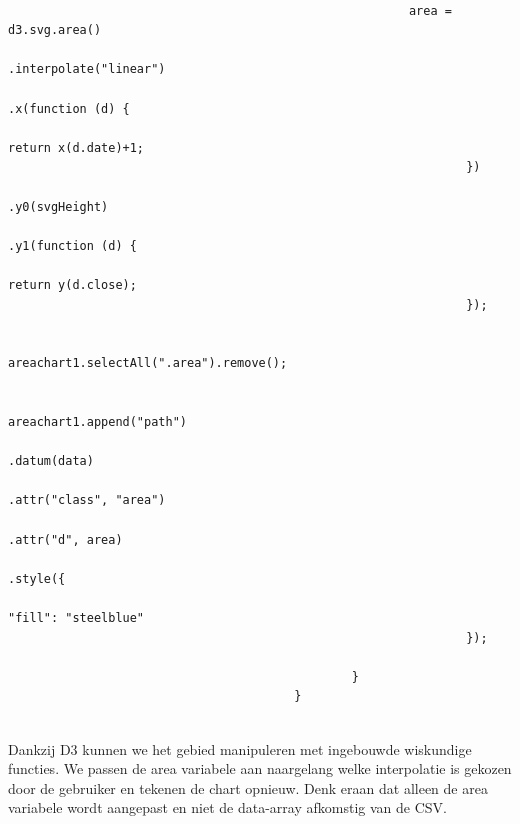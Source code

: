 \begin{lstlisting}[gobble=28]
													
                                                        area = d3.svg.area()
                                                                .interpolate("linear")
                                                                .x(function (d) {
                                                                        return x(d.date)+1;
                                                                })
                                                                .y0(svgHeight)
                                                                .y1(function (d) {
                                                                        return y(d.close);
                                                                });

                                                        areachart1.selectAll(".area").remove();

                                                        areachart1.append("path")
                                                                .datum(data)
                                                                .attr("class", "area")
                                                                .attr("d", area)
                                                                .style({
                                                                        "fill": "steelblue"
                                                                });

                                                }
                                        }
                                        
\end{lstlisting}

Dankzij D3 kunnen we het gebied manipuleren met ingebouwde wiskundige functies. We passen de area variabele aan naargelang welke interpolatie is gekozen door de gebruiker en tekenen de chart opnieuw. Denk eraan dat alleen de area variabele wordt aangepast en niet de data-array afkomstig van de CSV.

